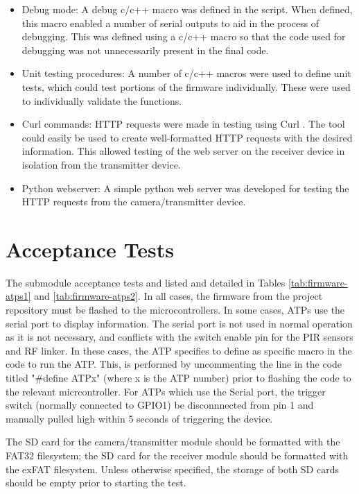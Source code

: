 \documentclass[class=report,11pt,crop=false]{standalone}
\begin{document}
\begin{itemize}
    \item Debug mode: A debug c/c++ macro was defined in the script. When defined, this macro enabled a number of serial outputs to aid in the process of debugging. This was defined using a c/c++ macro so that the code used for debugging was not unnecessarily present in the final code.
    \item Unit testing procedures: A number of c/c++ macros were used to define unit tests, which could test portions of the firmware individually. These were used to individually validate the functions.
    \item Curl commands: HTTP requests were made in testing using Curl \cite{hostetter1997curl}. The tool could easily be used to create well-formatted HTTP requests with the desired information. This allowed testing of the web server on the receiver device in isolation from the transmitter device.
    \item Python webserver: A simple python web server was developed for testing the HTTP requests from the camera/transmitter device.
\end{itemize}


\section{Acceptance Tests \label{s:firmware-atps}}

The submodule acceptance tests and listed and detailed in Tables \ref{tab:firmware-atps1} and \ref{tab:firmware-atps2}. In all cases, the firmware from the project repository must be flashed to the microcontrollers. In some cases, ATPs use the serial port to display information. The serial port is not used in normal operation as it is not necessary, and conflicts with the switch enable pin for the PIR sensors and RF linker.  In these cases, the ATP specifies to define as specific macro in the code to run the ATP. This, is performed by uncommenting the line in the code titled "\#define ATPx" (where x is the ATP number) prior to flashing the code to the relevant micrcontroller. For ATPs which use the Serial port, the trigger switch (normally connected to GPIO1) be disconnnected from pin 1 and manually pulled high within 5 seconds of triggering the device.

The SD card for the camera/transmitter module should be formatted with the FAT32 filesystem; the SD card for the receiver module should be formatted with the exFAT filesystem. Unless otherwise specified, the storage of both SD cards should be empty prior to starting the test.
\end{document}
